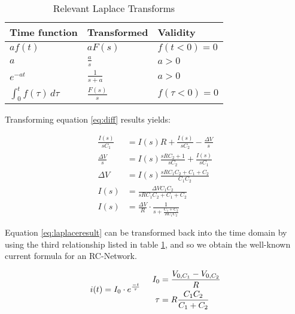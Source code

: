 \begin{table}
    \centering
    \caption{Relevant Laplace Transforms}
    \begin{threeparttable}\begin{tabular}{lll}
        \toprule
        \textbf{Time function}              & \textbf{Transformed} & \textbf{Validity} \\
        \midrule
        $af(t)$                   & $aF(s)$              & $f(t<0)=0$ \\
        $a$                       & $\frac{a}{s}$        & $a > 0$ \\
        $e^{-at}$                 & $\frac{1}{s+a}$      & $a > 0$  \\
        $\int_0^t f(\tau)\,d\tau$ & $\frac{F(s)}{s}$     & $f(\tau<0)=0$ \\
        \bottomrule
    \end{tabular}\end{threeparttable}
    \label{tab:laplace-transforms}
\end{table}

Transforming equation \ref{eq:diff} results yields:

\begin{align}
    \frac{I(s)}{sC_1} &= I(s)R + \frac{I(s)}{sC_2} - \frac{\Delta V}{s}\\
    \frac{\Delta V}{s} &= I(s)\frac{sRC_2 + 1}{sC_2} + \frac{I(s)}{sC_1} \\
    \Delta V &= I(s)\frac{sRC_1C_2 + C_1 + C_2}{C_1C_2} \\
    I(s) &= \frac{\Delta V C_1 C_2}{sRC_1C_2 + C_1 + C_2} \\
    I(s) &= \frac{\Delta V}{R}\cdot\frac{1}{s + \frac{C_1 + C_2}{RC_1C_2}} \label{eq:laplaceresult}
\end{align}

Equation \ref{eq:laplaceresult} can be transformed back into the  time  domain
by using the third relationship listed in  table \ref{tab:laplace-transforms},
and  so  we  obtain  the  well-known   current   formula  for  an  RC-Network.

\begin{equation}
    i(t) = I_0 \cdot e^{\frac{-t}{\tau}} \hspace{5mm} \begin{aligned}
        I_0  &= \frac{V_{0,C_1}-V_{0,C_2}}{R} \\
        \tau &= R \frac{C_1C_2}{C_1+C_2}
    \end{aligned}
    \label{eq:currentresult}
\end{equation}

